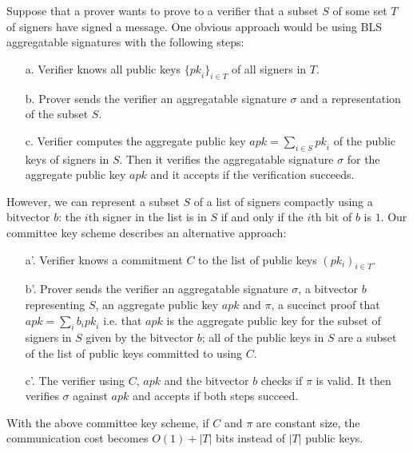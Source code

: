 \noindent Suppose that a prover wants to prove to a verifier that a subset $S$ of some set $T$ of signers have signed a message. 
One obvious approach would be using BLS aggregatable signatures with the following steps:

\begin{itemize}
\item[a.] Verifier knows all public keys $\{\mathit{pk}_i\}_{i \in T}$ of all signers in $T$.

\item[b.] Prover sends the verifier an aggregatable signature $\sigma$ and a representation of the subset $S$.

\item[c.] Verifier computes the aggregate public key $\mathit{apk}=\sum_{i \in S} \mathit{pk}_i$ of the public keys of signers in $S$. 
Then it verifies the aggregatable signature $\sigma$ for the aggregate public key $\mathit{apk}$ and it accepts if the verification succeeds.
\end{itemize}

\noindent However, we can represent a subset $S$ of a list of signers compactly using a bitvector $b$: 
the $i$th signer in the list is in $S$ if and only if the $i$th bit of $b$ is $1$. Our committee key scheme describes an alternative approach:

\begin{itemize}
\item[a'.] Verifier knows a commitment $C$ to the list of public keys $(pk_i)_{i \in T}$.

\item[b'.] Prover sends the verifier an aggregatable signature $\sigma$, a bitvector $b$ representing $S$, an aggregate public key 
$\mathit{apk}$ and $\pi$, a succinct proof that $\mathit{apk}=\sum_i b_i \mathit{pk}_i$ i.e. 
that $\mathit{apk}$ is the aggregate public key for the subset of signers in $S$ given by the bitvector $b$; all of the public keys in $S$ are a subset 
of the list of public keys committed to using $C$.

\item[c'.] The verifier using $C$, $\mathit{apk}$ and the bitvector $b$ checks if $\pi$ is valid. 
It then verifies $\sigma$ against $\mathit{apk}$ and accepts if both steps succeed.
\end{itemize}

\noindent With the above committee key scheme, if $C$ and $\pi$ are constant size, 
the communication cost becomes $O(1)+|T|$ bits instead of $|T|$ public keys.

